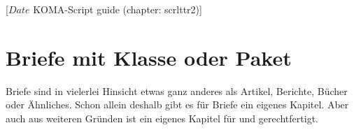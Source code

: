 %
%
%
%
%
%
%
%
% 
%
%
%
%

%
                 [$Date$
                  KOMA-Script guide (chapter: scrlttr2)]

\chapter{Briefe mit Klasse  oder Paket }

\BeginIndexGroup
{}%
%
Briefe sind in vielerlei Hinsicht etwas ganz anderes als Artikel, Berichte,
Bücher oder Ähnliches. Schon allein deshalb gibt es für Briefe ein eigenes
Kapitel. Aber auch aus weiteren Gründen ist ein eigenes Kapitel für
 und  gerechtfertigt.

